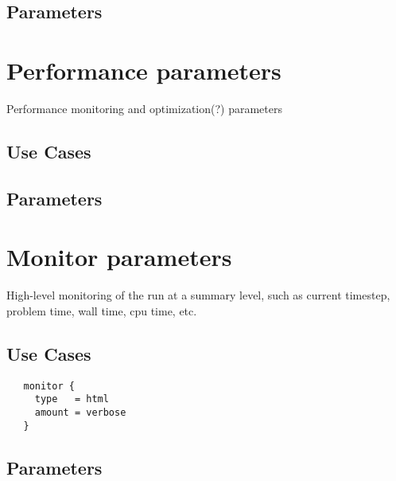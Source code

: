 \documentclass{book}
\begin{document}
\subsection{Parameters}
\section{Performance parameters} \label{s:performance}

Performance monitoring and optimization(?) parameters

\subsection{Use Cases}
\subsection{Parameters}

\section{Monitor parameters} \label{s:monitor}

High-level monitoring of the run at a summary level, such as current
timestep, problem time, wall time, cpu time, etc.

\subsection{Use Cases}
\begin{verbatim}
   monitor {
     type   = html
     amount = verbose
   }
\end{verbatim}
\subsection{Parameters}
\end{document}

